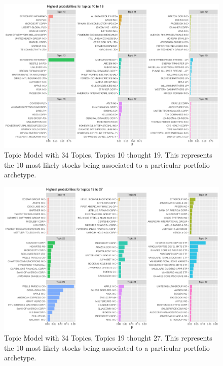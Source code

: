 \begin{figure}
	\centering
	\includegraphics[width=\linewidth]{Figures/ChapterV/LDA34_10_18}
	\caption[Topic Model with 34 Topics, Topics 10 thought 19]{Topic Model with 34 Topics, Topics 10 thought 19. This represents the 10 most likely stocks being associated to a particular portfolio archetype.}
	\label{fig:lda34-10-18}
\end{figure}

\begin{figure}
	\centering
	\includegraphics[width=\linewidth]{Figures/ChapterV/LDA34_19_27}
	\caption[Topic Model with 34 Topics, Topics 19 thought 27]{Topic Model with 34 Topics, Topics 19 thought 27. This represents the 10 most likely stocks being associated to a particular portfolio archetype.}
	\label{fig:lda34-19-27}
\end{figure}

